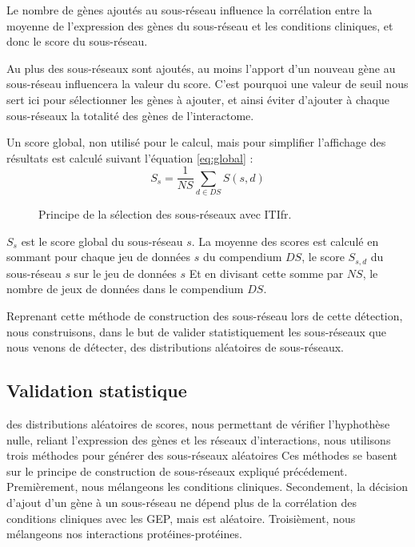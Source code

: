 			Le nombre de gènes ajoutés au sous-réseau influence la corrélation entre la moyenne de l'expression des gènes du sous-réseau et les conditions cliniques, et donc le score du sous-réseau.

			Au plus des sous-réseaux sont ajoutés, au moins l'apport d'un nouveau gène au sous-réseau influencera la valeur du score.
			C'est pourquoi une valeur de seuil nous sert ici pour sélectionner les gènes à ajouter, et ainsi éviter d'ajouter à chaque sous-réseaux la totalité des gènes de l'interactome.

			Un score global, non utilisé pour le calcul, mais pour simplifier l'affichage des résultats est calculé suivant l'équation \ref{eq:global} :
			\begin{equation}\label{eq:global}
				S_{s}=\frac{1}{NS}\sum_{d\in DS}S(s,d)
			\end{equation}

			\begin{figure}
				\begin{center}
					\def\svgwidth{\columnwidth}
					\caption{Principe de la sélection des sous-réseaux avec \acl{ITIfr}.}
					\label{fig:Algorithme}
				\end{center}
			\end{figure}
			$S_{s}$ est le score global du sous-réseau $s$.
			La moyenne des scores est calculé en sommant pour chaque jeu de données $s$ du compendium $DS$, le score $S_{s,d}$ du sous-réseau $s$ sur le jeu de données $s$
			Et en divisant cette somme par $NS$, le nombre de jeux de données dans le compendium $DS$.
		
			Reprenant cette méthode de construction des sous-réseau lors de cette détection, nous construisons, dans le but de valider statistiquement les sous-réseaux que nous venons de détecter, des distributions aléatoires de sous-réseaux.

		\subsection{\textcolor{green!45!black}{Validation statistique}}
			 des distributions aléatoires de scores, nous permettant de vérifier l'hyphothèse nulle, reliant l'expression des gènes et les réseaux d'interactions, nous utilisons trois méthodes pour générer des sous-réseaux aléatoires
			Ces méthodes se basent sur le principe de construction de sous-réseaux expliqué précédement.
			Premièrement, nous mélangeons les conditions cliniques.
			Secondement, la décision d'ajout d'un gène à un sous-réseau ne dépend plus de la corrélation des conditions cliniques avec les \acs{GEP}, mais est aléatoire.
			Troisièment, nous mélangeons nos interactions protéines-protéines.
			
